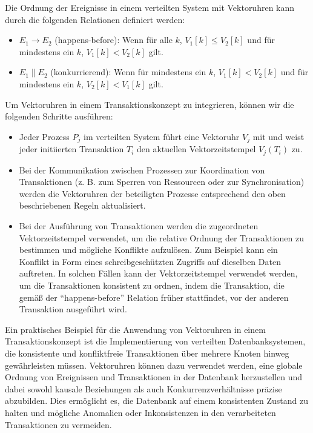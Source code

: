 Die Ordnung der Ereignisse in einem verteilten System mit Vektoruhren kann durch die folgenden Relationen definiert werden:
\begin{itemize}
\item $E_1 \to E_2$ (happens-before): Wenn für alle $k$, $V_1[k] \leq V_2[k]$ und für mindestens ein $k$, $V_1[k] < V_2[k]$ gilt.
\item $E_1 \parallel E_2$ (konkurrierend): Wenn für mindestens ein $k$, $V_1[k] < V_2[k]$ und für mindestens ein $k$, $V_2[k] < V_1[k]$ gilt.
\end{itemize}
Um Vektoruhren in einem Transaktionskonzept zu integrieren, können wir die folgenden Schritte ausführen:
\begin{itemize}
\item Jeder Prozess $P_j$ im verteilten System führt eine Vektoruhr $V_j$ mit und weist jeder initiierten Transaktion $T_i$ den aktuellen Vektorzeitstempel $V_j(T_i)$ zu.
\item Bei der Kommunikation zwischen Prozessen zur Koordination von Transaktionen (z. B. zum Sperren von Ressourcen oder zur Synchronisation) werden die Vektoruhren der beteiligten Prozesse entsprechend den oben beschriebenen Regeln aktualisiert.
\item Bei der Ausführung von Transaktionen werden die zugeordneten Vektorzeitstempel verwendet, um die relative Ordnung der Transaktionen zu bestimmen und mögliche Konflikte aufzulösen. Zum Beispiel kann ein Konflikt in Form eines schreibgeschützten Zugriffs auf dieselben Daten auftreten. In solchen Fällen kann der Vektorzeitstempel verwendet werden, um die Transaktionen konsistent zu ordnen, indem die Transaktion, die gemäß der \enquote{happens-before} Relation früher stattfindet, vor der anderen Transaktion ausgeführt wird.
\end{itemize}
Ein praktisches Beispiel für die Anwendung von Vektoruhren in einem Transaktionskonzept ist die Implementierung von verteilten Datenbanksystemen, die konsistente und konfliktfreie Transaktionen über mehrere Knoten hinweg gewährleisten müssen. Vektoruhren können dazu verwendet werden, eine globale Ordnung von Ereignissen und Transaktionen in der Datenbank herzustellen und dabei sowohl kausale Beziehungen als auch Konkurrenzverhältnisse präzise abzubilden. Dies ermöglicht es, die Datenbank auf einem konsistenten Zustand zu halten und mögliche Anomalien oder Inkonsistenzen in den verarbeiteten Transaktionen zu vermeiden.


